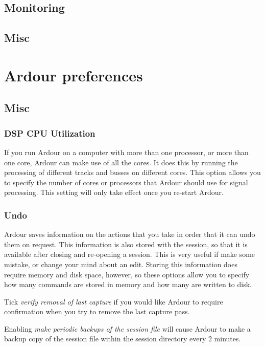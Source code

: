 \documentclass[10pt,a4paper]{book}
\begin{document}
{\subsection{Monitoring}

\subsection{Misc}



\section{Ardour preferences}

\subsection{Misc}

\subsubsection{DSP CPU Utilization}

If you run Ardour on a computer with more than one processor, or more
than one core, Ardour can make use of all the cores.  It does this by
running the processing of different tracks and busses on different
cores.  This option allows you to specify the number of cores or
processors that Ardour should use for signal processing.  This setting
will only take effect once you re-start Ardour.

\subsubsection{Undo}

Ardour saves information on the actions that you take in order that it
can undo them on request.  This information is also stored with the
session, so that it is available after closing and re-opening a
session.  This is very useful if make some mistake, or change your
mind about an edit.  Storing this information does require memory and
disk space, however, so these options allow you to specify how many
commands are stored in memory and how many are written to disk.

Tick \emph{verify removal of last capture} if you would like Ardour to
require confirmation when you try to remove the last capture pass.

Enabling \emph{make periodic backups of the session file} will cause
Ardour to make a backup copy of the session file within the session
directory every 2 minutes.

}
\end{document}
